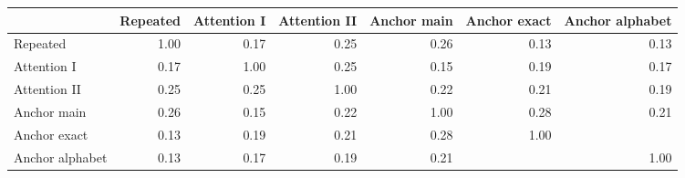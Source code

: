 \begin{tabular}{lrrrrrr}
  \toprule
 & Repeated & Attention I & Attention II & Anchor main & Anchor exact & Anchor alphabet \\ 
  \midrule
Repeated & 1.00 & 0.17 & 0.25 & 0.26 & 0.13 & 0.13 \\ 
  Attention I & 0.17 & 1.00 & 0.25 & 0.15 & 0.19 & 0.17 \\ 
  Attention II & 0.25 & 0.25 & 1.00 & 0.22 & 0.21 & 0.19 \\ 
  Anchor main & 0.26 & 0.15 & 0.22 & 1.00 & 0.28 & 0.21 \\ 
  Anchor exact & 0.13 & 0.19 & 0.21 & 0.28 & 1.00 &  \\ 
  Anchor alphabet & 0.13 & 0.17 & 0.19 & 0.21 &  & 1.00 \\ 
   \bottomrule
\end{tabular}
